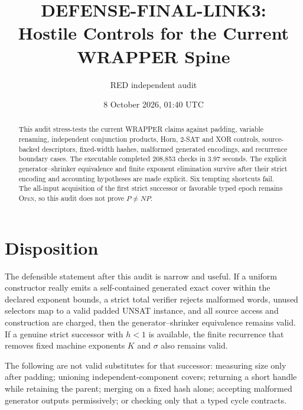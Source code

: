 \documentclass[11pt]{article}
\title{DEFENSE-FINAL-LINK3:\\Hostile Controls for the Current WRAPPER Spine}
\author{RED independent audit}
\date{8 October 2026, 01:40 UTC}
\newcommand{\Open}{\textsc{Open}}
\begin{document}
\maketitle

\begin{abstract}
This audit stress-tests the current WRAPPER claims against padding, variable
renaming, independent conjunction products, Horn, 2-SAT and XOR controls,
source-backed descriptors, fixed-width hashes, malformed generated encodings,
and recurrence boundary cases.  The executable completed 208,853 checks in
3.97 seconds.  The explicit generator--shrinker equivalence and finite exponent elimination survive
after their strict encoding and accounting hypotheses are made explicit.
Six tempting shortcuts fail.  The all-input acquisition of the first strict
successor or favorable typed epoch remains \Open, so this audit does not prove
$P\ne NP$.
\end{abstract}

\section{Disposition}

The defensible statement after this audit is narrow and useful.  If a uniform
constructor really emits a self-contained generated exact cover within the
declared exponent bounds, a strict total verifier rejects malformed words,
unused selectors map to a valid padded UNSAT instance, and all source access
and construction are charged, then the generator--shrinker equivalence remains valid.  If a
genuine strict successor with $h<1$ is available, the finite recurrence that
removes fixed machine exponents $K$ and $\sigma$ also remains valid.

The following are not valid substitutes for that successor: measuring size
only after padding; unioning independent-component covers; returning a short
handle while retaining the parent; merging on a fixed hash alone; accepting
malformed generator outputs permissively; or checking only that a typed cycle
contracts.
\end{document}
